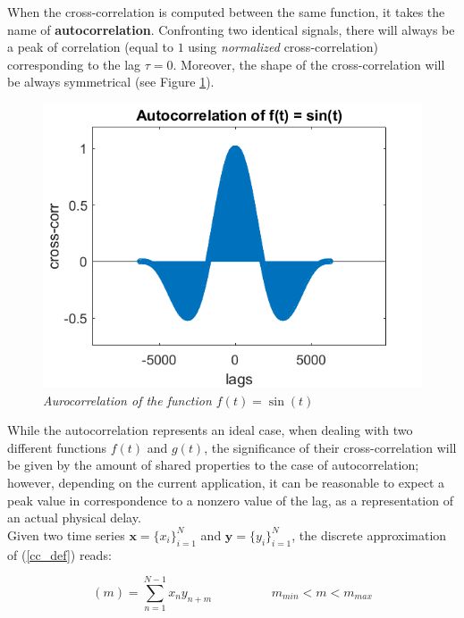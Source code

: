 \documentclass[12pt, a4paper]{article}
\begin{document}
When the cross-correlation is computed between the same function, it takes the name of \textbf{autocorrelation}. Confronting two identical signals, there will always be a peak of correlation (equal to $1$ using \textit{normalized} cross-correlation) corresponding to the lag $\tau = 0$. Moreover, the shape of the cross-correlation will be always symmetrical (see Figure \ref{autocorr}).

\begin{figure}[H]
	\begin{center}
		\includegraphics[scale=.75]{autocorr.png} 
	\end{center} 
	\caption{\textit{Aurocorrelation of the function $ f(t) = \sin(t) $}} \label{autocorr}
	
\end{figure}


While the autocorrelation represents an ideal case, when dealing with two different functions $f(t)$ and $g(t)$, the significance of their cross-correlation will be given by the amount of shared properties to the case of autocorrelation; however, depending on the current application, it can be reasonable to expect a peak value in correspondence to a nonzero value of the lag, as a representation of an actual physical delay.
\\

Given two time series $ \textbf{x} = \{x_i\}_{i=1}^N$ and  $\textbf{y} = \{y_i\}_{i=1}^N$, the discrete approximation of (\ref{cc_def}) reads:


\begin{equation}
	[\textbf{x} \star \textbf{y}] (m) =  \sum_{n=1}^{N-1} x_n y_{n+m} \hspace{2cm} m_{min} < m < m_{max}
\end{equation}  
\end{document}
